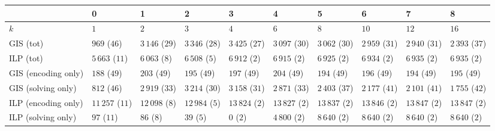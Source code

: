 \begin{tabular}{llllllllll}
\toprule
{} &                 0 &                1 &                2 &                3 &                4 &                5 &                6 &                7 &                8 \\
\midrule
$k$                 &               $1$ &              $2$ &              $3$ &              $4$ &              $6$ &              $8$ &             $10$ &             $12$ &             $16$ \\
GIS (tot)           &      $969$ ($46$) &  $3\,146$ ($29$) &  $3\,346$ ($28$) &  $3\,425$ ($27$) &  $3\,097$ ($30$) &  $3\,062$ ($30$) &  $2\,959$ ($31$) &  $2\,940$ ($31$) &  $2\,393$ ($37$) \\
ILP (tot)           &   $5\,663$ ($11$) &   $6\,063$ ($8$) &   $6\,508$ ($5$) &   $6\,912$ ($2$) &   $6\,915$ ($2$) &   $6\,925$ ($2$) &   $6\,934$ ($2$) &   $6\,935$ ($2$) &   $6\,935$ ($2$) \\
GIS (encoding only) &      $188$ ($49$) &     $203$ ($49$) &     $195$ ($49$) &     $197$ ($49$) &     $204$ ($49$) &     $194$ ($49$) &     $196$ ($49$) &     $194$ ($49$) &     $195$ ($49$) \\
GIS (solving only)  &      $812$ ($46$) &  $2\,919$ ($33$) &  $3\,214$ ($30$) &  $3\,158$ ($31$) &  $2\,871$ ($33$) &  $2\,403$ ($37$) &  $2\,177$ ($41$) &  $2\,101$ ($41$) &  $1\,755$ ($42$) \\
ILP (encoding only) &  $11\,257$ ($11$) &  $12\,098$ ($8$) &  $12\,984$ ($5$) &  $13\,824$ ($2$) &  $13\,827$ ($2$) &  $13\,837$ ($2$) &  $13\,846$ ($2$) &  $13\,847$ ($2$) &  $13\,847$ ($2$) \\
ILP (solving only)  &       $97$ ($11$) &       $86$ ($8$) &       $39$ ($5$) &        $0$ ($2$) &   $4\,800$ ($2$) &   $8\,640$ ($2$) &   $8\,640$ ($2$) &   $8\,640$ ($2$) &   $8\,640$ ($2$) \\
\bottomrule
\end{tabular}
